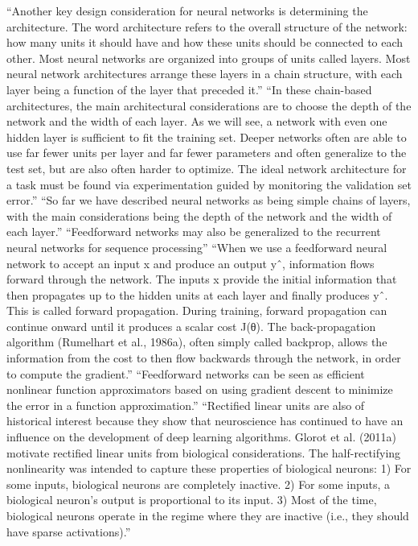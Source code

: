 \documentclass{automatextcc}
\begin{document}
``Another key design consideration for neural networks is determining the architecture. The word architecture refers to the overall structure of the network: how many units it should have and how these units should be connected to each other. Most neural networks are organized into groups of units called layers. Most neural network architectures arrange these layers in a chain structure, with each layer being a function of the layer that preceded it.''
``In these chain-based architectures, the main architectural considerations are to choose the depth of the network and the width of each layer. As we will see, a network with even one hidden layer is sufficient to fit the training set. Deeper networks often are able to use far fewer units per layer and far fewer parameters and often generalize to the test set, but are also often harder to optimize. The ideal network architecture for a task must be found via experimentation guided by monitoring the validation set error.''
``So far we have described neural networks as being simple chains of layers, with the main considerations being the depth of the network and the width of each layer.''
``Feedforward networks may also be generalized to the recurrent neural networks for sequence processing''
``When we use a feedforward neural network to accept an input x and produce an output yˆ, information flows forward through the network. The inputs x provide the initial information that then propagates up to the hidden units at each layer and finally produces yˆ. This is called forward propagation. During training, forward propagation can continue onward until it produces a scalar cost J(θ). The back-propagation algorithm (Rumelhart et al., 1986a), often simply called backprop, allows the information from the cost to then flow backwards through the network, in order to compute the gradient.''
``Feedforward networks can be seen as efficient nonlinear function approximators based on using gradient descent to minimize the error in a function approximation.''
``Rectified linear units are also of historical interest because they show that neuroscience has continued to have an influence on the development of deep learning algorithms. Glorot et al. (2011a) motivate rectified linear units from biological considerations. The half-rectifying nonlinearity was intended to capture these properties of biological neurons: 1) For some inputs, biological neurons are completely inactive. 2) For some inputs, a biological neuron’s output is proportional to its input. 3) Most of the time, biological neurons operate in the regime where they are inactive (i.e., they should have sparse activations).''
\end{document}
